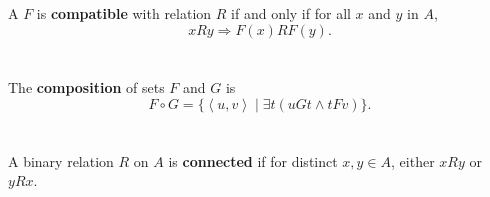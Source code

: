 \documentclass{report}
\newcommand{\pair}[1]{\left< #1 \right>}
\begin{document}
\begin{definition}


\end{definition}

\section{}%

A  $F$ is \textbf{compatible} with relation $R$ if and
  only if for all $x$ and $y$ in $A$,
  $$xRy \Rightarrow F(x)RF(y).$$

\begin{definition}


\end{definition}

\section{}%

The \textbf{composition} of sets $F$ and $G$ is
  $$F \circ G = \{\pair{u, v} \mid \exists t(uGt \land tFv)\}.$$

\begin{definition}

  \statementpadding



\end{definition}

\section{}%

A binary relation $R$ on $A$ is \textbf{connected} if for distinct $x, y \in A$, either $xRy$ or $yRx$.

\begin{definition}


\end{definition}

\section{}%
\end{document}
